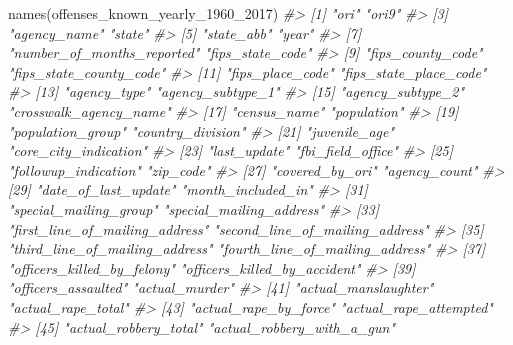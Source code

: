 \documentclass[
  12pt,
]{book}
\newenvironment{Shaded}{\begin{snugshade}}{\end{snugshade}}
\newcommand{\CommentTok}[1]{\textcolor[rgb]{0.37,0.37,0.37}{\textit{#1}}}
\newcommand{\FunctionTok}[1]{\textcolor[rgb]{0,0,0}{#1}}
\newcommand{\NormalTok}[1]{#1}
\begin{document}
\begin{Shaded}
\begin{Highlighting}[]
\FunctionTok{names}\NormalTok{(offenses\_known\_yearly\_1960\_2017)}
\CommentTok{\#\textgreater{}   [1] "ori"                            "ori9"                          }
\CommentTok{\#\textgreater{}   [3] "agency\_name"                    "state"                         }
\CommentTok{\#\textgreater{}   [5] "state\_abb"                      "year"                          }
\CommentTok{\#\textgreater{}   [7] "number\_of\_months\_reported"      "fips\_state\_code"               }
\CommentTok{\#\textgreater{}   [9] "fips\_county\_code"               "fips\_state\_county\_code"        }
\CommentTok{\#\textgreater{}  [11] "fips\_place\_code"                "fips\_state\_place\_code"         }
\CommentTok{\#\textgreater{}  [13] "agency\_type"                    "agency\_subtype\_1"              }
\CommentTok{\#\textgreater{}  [15] "agency\_subtype\_2"               "crosswalk\_agency\_name"         }
\CommentTok{\#\textgreater{}  [17] "census\_name"                    "population"                    }
\CommentTok{\#\textgreater{}  [19] "population\_group"               "country\_division"              }
\CommentTok{\#\textgreater{}  [21] "juvenile\_age"                   "core\_city\_indication"          }
\CommentTok{\#\textgreater{}  [23] "last\_update"                    "fbi\_field\_office"              }
\CommentTok{\#\textgreater{}  [25] "followup\_indication"            "zip\_code"                      }
\CommentTok{\#\textgreater{}  [27] "covered\_by\_ori"                 "agency\_count"                  }
\CommentTok{\#\textgreater{}  [29] "date\_of\_last\_update"            "month\_included\_in"             }
\CommentTok{\#\textgreater{}  [31] "special\_mailing\_group"          "special\_mailing\_address"       }
\CommentTok{\#\textgreater{}  [33] "first\_line\_of\_mailing\_address"  "second\_line\_of\_mailing\_address"}
\CommentTok{\#\textgreater{}  [35] "third\_line\_of\_mailing\_address"  "fourth\_line\_of\_mailing\_address"}
\CommentTok{\#\textgreater{}  [37] "officers\_killed\_by\_felony"      "officers\_killed\_by\_accident"   }
\CommentTok{\#\textgreater{}  [39] "officers\_assaulted"             "actual\_murder"                 }
\CommentTok{\#\textgreater{}  [41] "actual\_manslaughter"            "actual\_rape\_total"             }
\CommentTok{\#\textgreater{}  [43] "actual\_rape\_by\_force"           "actual\_rape\_attempted"         }
\CommentTok{\#\textgreater{}  [45] "actual\_robbery\_total"           "actual\_robbery\_with\_a\_gun"     }

\end{Highlighting}
\end{Shaded}
\end{document}
